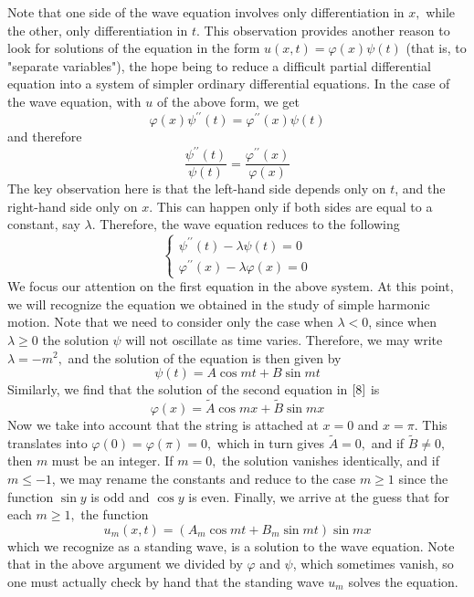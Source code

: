 \documentclass[12pt]{book}
\theoremstyle{definition}\newtheorem{dfn}{Définition}[chapter]
\theoremstyle{plain}\newtheorem{thm}{Théorème}[chapter]
\theoremstyle{plain}\newtheorem{prp}{Proposition}[chapter]
\theoremstyle{plain}\newtheorem{lem}{\bf Lemme}[chapter]
\theoremstyle{plain}\newtheorem{axm}{\bf Axiome}[chapter]
\theoremstyle{plain}\newtheorem{lmm}{\bf Lemme}[chapter]
\theoremstyle{plain}\newtheorem{exm}{\bf Example}[chapter]
\theoremstyle{plain}\newtheorem{cor}{\bf Corollaire}[chapter]
\theoremstyle{remark}\newtheorem{rem}{Remarque}[chapter]
\begin{document}
Note that one side of the wave equation involves only differentiation in $x,$ while the other, only differentiation in $t .$ This observation provides another reason to look for solutions of the equation in the form $u(x, t)=\varphi(x) \psi(t)$ (that is, to "separate variables"), the hope being to reduce a difficult partial differential equation into a system of simpler ordinary differential equations. In the case of the wave equation, with $u$ of the above form, we get
$$
\varphi(x) \psi^{\prime \prime}(t)=\varphi^{\prime \prime}(x) \psi(t)
$$
and therefore
$$
\frac{\psi^{\prime \prime}(t)}{\psi(t)}=\frac{\varphi^{\prime \prime}(x)}{\varphi(x)}
$$
The key observation here is that the left-hand side depends only on $t$, and the right-hand side only on $x$. This can happen only if both sides are equal to a constant, say $\lambda$. Therefore, the wave equation reduces to the following
\begin{equation}
\left\{\begin{array}{l}
\psi^{\prime \prime}(t)-\lambda \psi(t)=0 \\
\varphi^{\prime \prime}(x)-\lambda \varphi(x)=0
\end{array}\right.\label{8}
\end{equation}
We focus our attention on the first equation in the above system. At this point, we will recognize the equation we obtained in the study of simple harmonic motion. Note that we need to consider only the case when $\lambda<0$, since when $\lambda \geq 0$ the solution $\psi$ will not oscillate as time varies. Therefore, we may write $\lambda=-m^{2},$ and the solution of the equation is then given by
$$
\psi(t)=A \cos m t+B \sin m t
$$
Similarly, we find that the solution of the second equation in $\ref{8}$ is
$$
\varphi(x)=\tilde{A} \cos m x+\tilde{B} \sin m x
$$
Now we take into account that the string is attached at $x=0$ and $x=\pi$. This translates into $\varphi(0)=\varphi(\pi)=0,$ which in turn gives $\tilde{A}=0,$ and if $\tilde{B} \neq 0,$ then $m$ must be an integer. If $m=0,$ the solution vanishes identically, and if $m \leq-1$, we may rename the constants and reduce to the case $m \geq 1$ since the function $\sin y$ is odd and $\cos y$ is even. Finally, we arrive at the guess that for each $m \geq 1,$ the function
$$
u_{m}(x, t)=\left(A_{m} \cos m t+B_{m} \sin m t\right) \sin m x
$$
which we recognize as a standing wave, is a solution to the wave equation. Note that in the above argument we divided by $\varphi$ and $\psi$, which sometimes vanish, so one must actually check by hand that the standing wave $u_{m}$ solves the equation.
\end{document}
